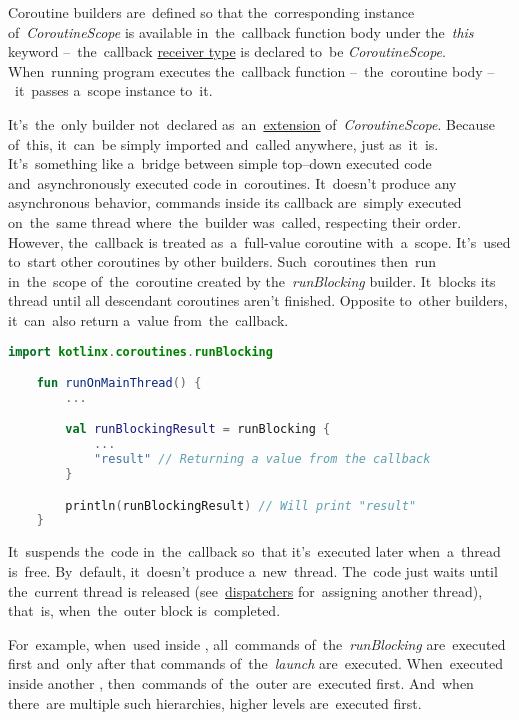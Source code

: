 Coroutine builders are~defined so that the~corresponding instance \mbox{of \textit{CoroutineScope}} is available in~the~callback function body under \mbox{the \textit{this}} keyword --~the~callback \hyperref[kotlinanonymousreceivertype]{receiver type} is declared to~be \mbox{\textit{CoroutineScope}.}
When~running program executes the~callback function --~the~coroutine body --~it~passes a~scope instance to~it.

\label{kotlincoroutinerunblocking}
It's~the~only builder not~declared as~an~\hyperref[kotlinextension]{extension} of~\textit{CoroutineScope}.
Because of~this, it~can~be simply imported and~called anywhere, just as~it~is.
It's~something like a~bridge between simple top--down executed code and~asynchronously executed code in~coroutines.
It~doesn't produce any asynchronous behavior, commands inside its callback are~simply executed on~the~same thread where~the~builder was~called, respecting their order.
However, the~callback is treated as~a~full-value coroutine with~a~scope.
It's~used to~start other coroutines by other builders.
Such~coroutines then~run in~the~scope of~the~coroutine created by \mbox{the \textit{runBlocking}} builder.
It~blocks its thread until all descendant coroutines aren't finished.
Opposite to~other builders, it~can~also return a~value from~the~callback.

\begin{lstlisting}[language=Kotlin]
    import kotlinx.coroutines.runBlocking

    fun runOnMainThread() {
        ...

        val runBlockingResult = runBlocking {
            ...
            "result" // Returning a value from the callback
        }

        println(runBlockingResult) // Will print "result"
    }
\end{lstlisting}

\label{kotlincoroutinelaunch}
It~suspends the~code in~the~callback so~that it's~executed later when~a~thread is~free.
By~default, it~doesn't produce a~new~thread.
The~code just waits until the~current thread is released (see~\hyperref[kotlincoroutinedispatcher]{dispatchers} for~assigning another thread), that~is, when~the~outer block is~completed.

For~example, when~used inside , all~commands \mbox{of the \textit{runBlocking}} are~executed first and~only after that commands \mbox{of the \textit{launch}} are~executed.
When~executed inside another , then~commands of~the~outer  are~executed first.
And~when there~are multiple such  hierarchies, higher levels are~executed first.

